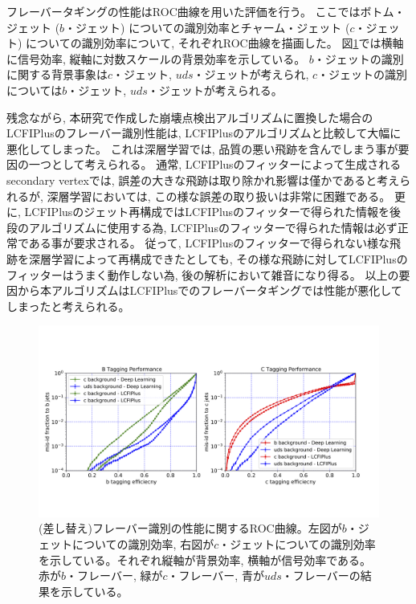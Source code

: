 フレーバータギングの性能はROC曲線を用いた評価を行う。
ここではボトム・ジェット ($b$・ジェット) についての識別効率とチャーム・ジェット ($c$・ジェット) についての識別効率について, それぞれROC曲線を描画した。
図\ref{5-2-3-1FlavorTaggingROCCurve}では横軸に信号効率, 縦軸に対数スケールの背景効率を示している。
$b$・ジェットの識別に関する背景事象は$c$・ジェット, $uds$・ジェットが考えられ, $c$・ジェットの識別については$b$・ジェット, $uds$・ジェットが考えられる。

残念ながら, 本研究で作成した崩壊点検出アルゴリズムに置換した場合のLCFIPlusのフレーバー識別性能は, LCFIPlusのアルゴリズムと比較して大幅に悪化してしまった。
これは深層学習では, 品質の悪い飛跡を含んでしまう事が要因の一つとして考えられる。
通常, LCFIPlusのフィッターによって生成されるsecondary vertexでは, 誤差の大きな飛跡は取り除かれ影響は僅かであると考えられるが, 深層学習においては, この様な誤差の取り扱いは非常に困難である。
更に, LCFIPlusのジェット再構成ではLCFIPlusのフィッターで得られた情報を後段のアルゴリズムに使用する為, LCFIPlusのフィッターで得られた情報は必ず正常である事が要求される。
従って, LCFIPlusのフィッターで得られない様な飛跡を深層学習によって再構成できたとしても, その様な飛跡に対してLCFIPlusのフィッターはうまく動作しない為, 後の解析において雑音になり得る。
以上の要因から本アルゴリズムはLCFIPlusでのフレーバータギングでは性能が悪化してしまったと考えられる。

\begin{figure}[htbp]
 \centering
 \includegraphics[trim = 0 150 0 200, width=1.0\textwidth, clip]{Figure/5Comparison/5-2-3-1FlavorTaggingROCCurve.png}
 \caption[(差し替え)フレーバータギングの性能に関するROC曲線]{(差し替え)フレーバー識別の性能に関するROC曲線。左図が$b$・ジェットについての識別効率, 右図が$c$・ジェットについての識別効率を示している。それぞれ縦軸が背景効率, 横軸が信号効率である。赤が$b$・フレーバー, 緑が$c$・フレーバー, 青が$uds$・フレーバーの結果を示している。}
 \label{5-2-3-1FlavorTaggingROCCurve}
\end{figure}

